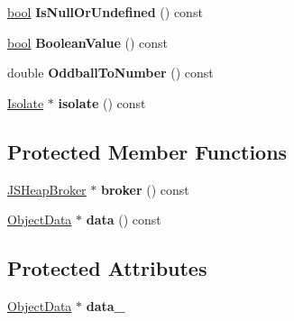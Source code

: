 \begin{DoxyCompactItemize}
\mbox{\label{classv8_1_1internal_1_1compiler_1_1ObjectRef_aaefa93ecd2bf58348f76061508f936a7}} 
\mbox{\hyperlink{classbool}{bool}} {\bfseries Is\+Null\+Or\+Undefined} () const
\item 
\mbox{\label{classv8_1_1internal_1_1compiler_1_1ObjectRef_a7a31cd10325a8a6bf2512c514101497c}} 
\mbox{\hyperlink{classbool}{bool}} {\bfseries Boolean\+Value} () const
\item 
\mbox{\label{classv8_1_1internal_1_1compiler_1_1ObjectRef_a636e6f96ae36ffa7323f9bce48b98b35}} 
double {\bfseries Oddball\+To\+Number} () const
\item 
\mbox{\label{classv8_1_1internal_1_1compiler_1_1ObjectRef_a9a9d24057f62938fb8f7eb52b40c8210}} 
\mbox{\hyperlink{classv8_1_1internal_1_1Isolate}{Isolate}} $\ast$ {\bfseries isolate} () const
\end{DoxyCompactItemize}
\subsection*{Protected Member Functions}
\begin{DoxyCompactItemize}
\item 
\mbox{\label{classv8_1_1internal_1_1compiler_1_1ObjectRef_a1cdc6f3e5a8a646e8d047a9298f2d16a}} 
\mbox{\hyperlink{classv8_1_1internal_1_1compiler_1_1JSHeapBroker}{J\+S\+Heap\+Broker}} $\ast$ {\bfseries broker} () const
\item 
\mbox{\label{classv8_1_1internal_1_1compiler_1_1ObjectRef_a4c82374adb8ed0acaf6c969be4a68caf}} 
\mbox{\hyperlink{classv8_1_1internal_1_1compiler_1_1ObjectData}{Object\+Data}} $\ast$ {\bfseries data} () const
\end{DoxyCompactItemize}
\subsection*{Protected Attributes}
\begin{DoxyCompactItemize}
\item 
\mbox{\label{classv8_1_1internal_1_1compiler_1_1ObjectRef_ae2cc62ef95be67d98819c709ef2e5712}} 
\mbox{\hyperlink{classv8_1_1internal_1_1compiler_1_1ObjectData}{Object\+Data}} $\ast$ {\bfseries data\+\_\+}
\end{DoxyCompactItemize}


